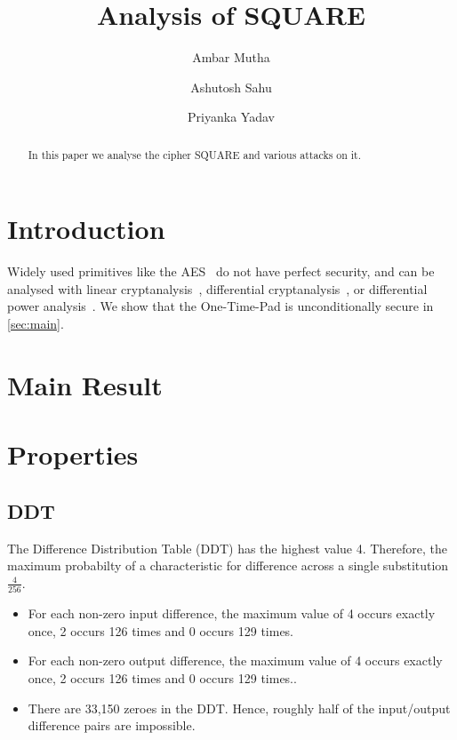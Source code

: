 \documentclass[preprint]{transcrypto}
\author{Ambar Mutha \and Ashutosh Sahu \and Priyanka Yadav}
\institute{
  IIT Bhilai, Raipur, India, \email[ambarm@iitbhilai.ac.in,ashutoshsahu@iitbhilai.ac.in,priyankay@iitbhilai.ac.in]{{ambarm,ashutoshsahu,priyankay}@iitbhilai.ac.in}
}
\title{Analysis of SQUARE}
\begin{document}
\maketitle




\begin{abstract}
  In this paper we analyse the cipher SQUARE and various attacks on it.

\end{abstract}


\section{Introduction}

Widely used primitives like the AES~\cite{AES} do not have perfect
security, and can be analysed with linear
cryptanalysis~\cite{EC:Matsui93}, differential
cryptanalysis~\cite{JC:BihSha91}, or differential power
analysis~\cite{C:KocJafJun99}.  We show that the One-Time-Pad is
unconditionally secure in \autoref{sec:main}.


\section{Main Result}
\label{sec:main}

\section{Properties}
\subsection{DDT}
The Difference Distribution Table (DDT) has the highest value 4. Therefore, the maximum probabilty of a characteristic for difference across a single substitution $\frac{4}{256}$.

\begin{itemize}
  \item For each non-zero input difference, the maximum value of 4 occurs exactly once, 2 occurs 126 times and 0 occurs 129 times.
  \item For each non-zero output difference, the maximum value of 4 occurs exactly once, 2 occurs 126 times and 0 occurs 129 times..
  \item There are 33,150 zeroes in the DDT. Hence, roughly half of the input/output difference pairs are impossible.
\end{itemize}
\end{document}

